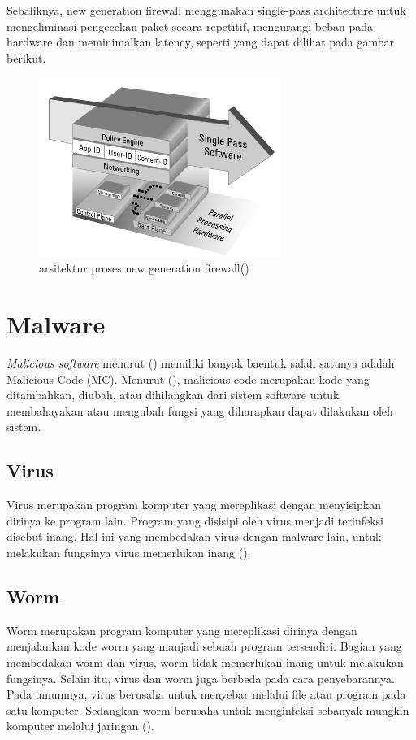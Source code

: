 Sebaliknya, new generation firewall menggunakan single-pass architecture untuk mengeliminasi pengecekan paket secara repetitif, mengurangi beban pada hardware dan meminimalkan latency, seperti yang dapat dilihat pada gambar berikut.
\begin{figure}[H]
	\centering
	\includegraphics[width=0.7\textwidth]{resources/architecture_NGFW.png}
	\caption{arsitektur proses new generation firewall(\cite{miller2011next})}
	\label{fig:architecture_NGFW}
\end{figure}

\section{Malware}
\textit{Malicious software} menurut (\cite{idika2007survey}) memiliki banyak baentuk salah satunya adalah Malicious Code (MC). Menurut (\cite{attackingmalcode}), malicious code merupakan kode yang ditambahkan, diubah, atau dihilangkan dari sistem software untuk membahayakan atau mengubah fungsi yang diharapkan dapat dilakukan oleh sistem.

\subsection{Virus}
Virus merupakan program komputer yang mereplikasi dengan menyisipkan dirinya ke program lain. Program yang disisipi oleh virus menjadi terinfeksi disebut inang. Hal ini yang membedakan virus dengan malware lain, untuk melakukan fungsinya virus memerlukan inang (\cite{attackingmalcode}). 

\subsection{Worm}
Worm merupakan program komputer yang mereplikasi dirinya dengan menjalankan kode worm yang manjadi sebuah program tersendiri. Bagian yang membedakan worm dan virus, worm tidak memerlukan inang untuk melakukan fungsinya. Selain itu, virus dan worm juga berbeda pada cara penyebarannya. Pada umumnya, virus berusaha untuk menyebar melalui file atau program pada satu komputer. Sedangkan worm berusaha untuk menginfeksi sebanyak mungkin komputer melalui jaringan (\cite{attackingmalcode}).

